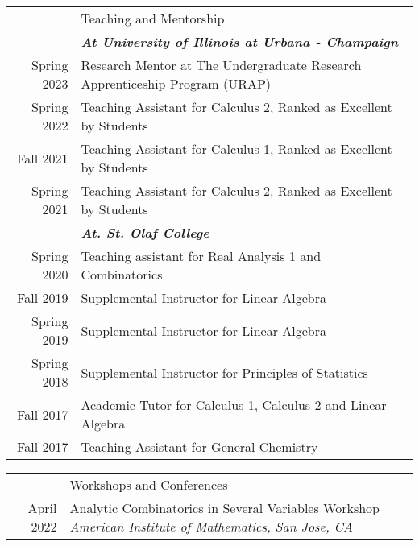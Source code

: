 \documentclass[letterpaper, 11pt]{article}
\newcommand{\headingfont}{\Large\color{Red}}
\newenvironment{SectionTable}[1]{
	\renewcommand*{\arraystretch}{1.7}
	\setlength{\tabcolsep}{10pt}
	\begin{longtable}{Rp{5.2in}} & #1 \\}
	{\end{longtable}\vspace{-.3cm}}
\begin{document}
	\begin{SectionTable}{\headingfont Teaching and Mentorship}
		& \textit{\textbf{At University of Illinois at Urbana - Champaign}}\\
		Spring 2023 & 
		Research Mentor at The Undergraduate Research Apprenticeship Program (URAP) \\
		
		Spring 2022 & 
		Teaching Assistant for Calculus 2, Ranked as Excellent by Students\\
		
		Fall 2021 & 
		Teaching Assistant for Calculus 1, Ranked as Excellent by Students\\
	
		Spring 2021 & 
		Teaching Assistant for Calculus 2, Ranked as Excellent by Students\\
		
		& \textit{\textbf{At. St. Olaf College}} \\
		Spring 2020 & 
		Teaching assistant for Real Analysis 1 and Combinatorics \\
		Fall 2019 & 
		Supplemental Instructor for Linear Algebra\\
		Spring 2019 & 
		Supplemental Instructor for Linear Algebra\\
		Spring 2018 & 
		Supplemental Instructor for Principles of Statistics\\
		Fall 2017 & 
		Academic Tutor for Calculus 1, Calculus 2 and Linear Algebra\\
		Fall 2017 & 
		Teaching Assistant for General Chemistry  \\
	
		

	\end{SectionTable}

	\begin{SectionTable}{\headingfont Workshops and Conferences}
		April 2022 &
		Analytic Combinatorics in Several Variables Workshop \newline
		\textit{American Institute of Mathematics, San Jose, CA} \\
		
	\end{SectionTable}
\end{document}

